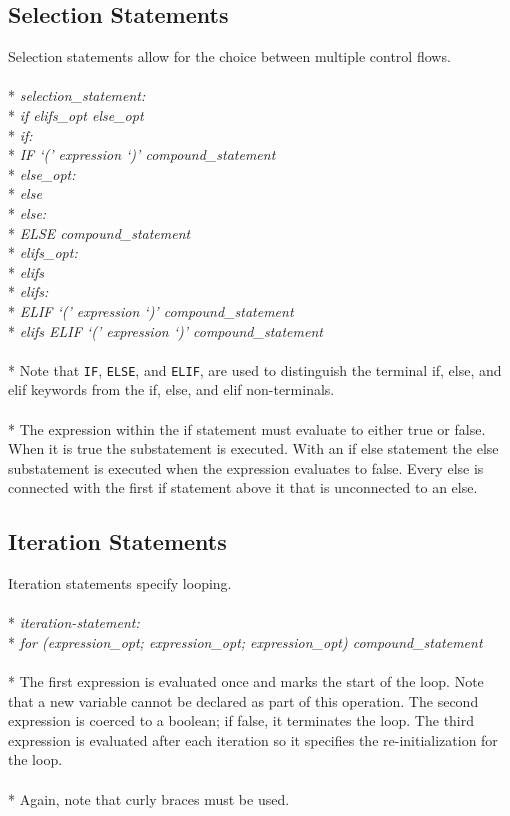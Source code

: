 \documentclass[11pt]{article}
\newcommand{\tab}{\hspace*{2em}}
\begin{document}
\subsection{Selection Statements}
Selection statements allow for the choice between multiple control flows.
\\ \\* \tab \emph{selection\_statement: }
\\* \tab \tab \emph{if elifs\_opt else\_opt}
\\* \tab \emph{if:}
\\* \tab \tab \emph{IF `(' expression `)' compound\_statement}
\\* \tab \emph{else\_opt:}
\\* \tab \tab \emph{else}
\\* \tab \emph{else:}
\\* \tab \tab \emph{ELSE compound\_statement}
\\* \tab \emph{elifs\_opt:}
\\* \tab \tab \emph{elifs}
\\* \tab \emph{elifs:}
\\* \tab \tab \emph{ELIF `(' expression `)' compound\_statement}
\\* \tab \tab \emph{elifs ELIF `(' expression `)' compound\_statement}
\\ \\* Note that \verb!IF!, \verb!ELSE!, and \verb!ELIF!, are used to distinguish the terminal if, else, and elif keywords from the if, else, and elif non-terminals.
\\ \\* The expression within the if statement must evaluate to either true or false. When it is true the substatement is executed. With an if else statement the else substatement is executed when the expression evaluates to false. Every else is connected with the first if statement above it that is unconnected to an else.

\subsection{Iteration Statements}
Iteration statements specify looping.
\\ \\* \tab \emph{iteration-statement:}
\\* \tab \tab \emph{for (expression\_opt; expression\_opt; expression\_opt) compound\_statement}
\\ \\* The first expression is evaluated once and marks the start of the loop. Note that a new variable cannot be declared as part of this operation. The second expression is coerced to a boolean; if false, it terminates the loop. The third expression is evaluated after each iteration so it specifies the re-initialization for the loop.
\\ \\* Again, note that curly braces must be used.
\end{document}
